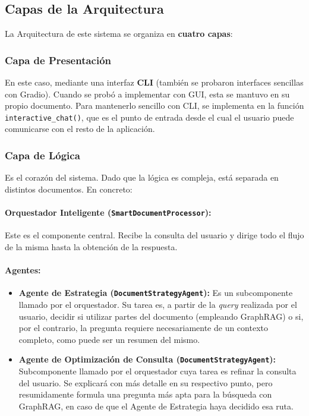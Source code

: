 \subsection{Capas de la Arquitectura}

La Arquitectura de este sistema se organiza en \textbf{cuatro capas}:

\subsubsection{Capa de Presentación}

En este caso, mediante una interfaz \textbf{CLI} (también se probaron interfaces sencillas con Gradio).
Cuando se probó a implementar con GUI, esta se mantuvo en su propio documento.
Para mantenerlo sencillo con CLI, se implementa en la función \texttt{interactive\_chat()}, que es el punto de entrada desde el cual el usuario puede comunicarse con el resto de la aplicación.

\subsubsection{Capa de Lógica}

Es el corazón del sistema.
Dado que la lógica es compleja, está separada en distintos documentos. En concreto:

\paragraph{Orquestador Inteligente (\texttt{SmartDocumentProcessor}):}
Este es el componente central.
Recibe la consulta del usuario y dirige todo el flujo de la misma hasta la obtención de la respuesta.

\paragraph{Agentes:}
\begin{itemize}
    \item \textbf{Agente de Estrategia (\texttt{DocumentStrategyAgent}):}
    Es un subcomponente llamado por el orquestador.
    Su tarea es, a partir de la \textit{query} realizada por el usuario, decidir si utilizar partes del documento (empleando GraphRAG) o si, por el contrario, la pregunta requiere necesariamente de un contexto completo, como puede ser un resumen del mismo.

    \item \textbf{Agente de Optimización de Consulta (\texttt{DocumentStrategyAgent}):}
    Subcomponente llamado por el orquestador cuya tarea es refinar la consulta del usuario.
    Se explicará con más detalle en su respectivo punto, pero resumidamente formula una pregunta más apta para la búsqueda con GraphRAG, en caso de que el Agente de Estrategia haya decidido esa ruta.
\end{itemize}

